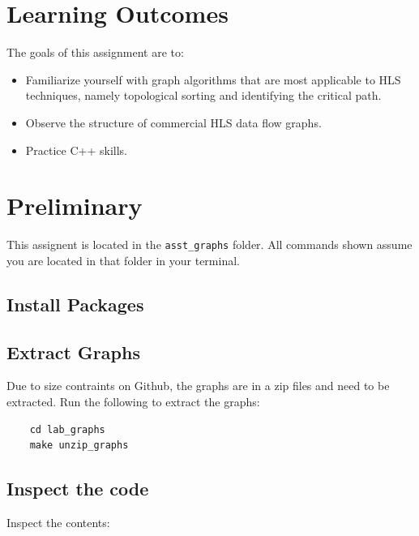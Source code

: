 



\setuppage



\maketitle
\thispagestyle{fancy}

\section{Learning Outcomes}
The goals of this assignment are to:
\begin{itemize}
	\item Familiarize yourself with graph algorithms that are most applicable to HLS techniques, namely topological sorting and identifying the critical path.
	\item Observe the structure of commercial HLS data flow graphs.
	\item Practice C++ skills.
\end{itemize}

\section{Preliminary}
This assignent is located in the \texttt{asst\_graphs} folder.  All commands shown assume you are located in that folder in your terminal.

\subsection{Install Packages}

\subsection{Extract Graphs}
Due to size contraints on Github, the graphs are in a zip files and need to be extracted.  Run the following to extract the graphs:
\begin{lstlisting}
	cd lab_graphs
	make unzip_graphs
\end{lstlisting}

\subsection{Inspect the code}
 Inspect the contents:

